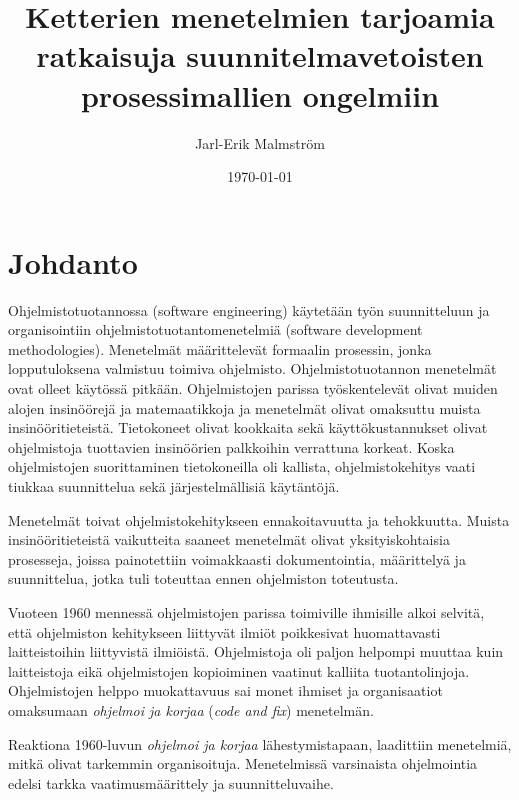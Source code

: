\documentclass[finnish]{tktltiki2}
\title{Ketterien menetelmien tarjoamia ratkaisuja suunnitelmavetoisten prosessimallien ongelmiin}
\author{Jarl-Erik Malmström}
\date{\today}
\theoremstyle{definition}
\theoremstyle{remark}
\begin{document}

\maketitle        %
\makeabstract     %

\tableofcontents  %
\newpage          %



\section{Johdanto}
 
Ohjelmistotuotannossa (software engineering) käytetään työn suunnitteluun ja organisointiin ohjelmistotuotantomenetelmiä (software development methodologies). Menetelmät määrittelevät formaalin prosessin, jonka lopputuloksena valmistuu toimiva ohjelmisto. Ohjelmistotuotannon menetelmät ovat olleet käytössä pitkään. Ohjelmistojen parissa työskentelevät olivat muiden alojen insinöörejä ja matemaatikkoja ja menetelmät olivat omaksuttu muista insinööritieteistä. Tietokoneet olivat kookkaita sekä käyttökustannukset olivat ohjelmistoja tuottavien insinöörien palkkoihin verrattuna korkeat. Koska ohjelmistojen suorittaminen tietokoneilla oli kallista, ohjelmistokehitys vaati tiukkaa suunnittelua sekä järjestelmällisiä käytäntöjä\cite{BOE06}.   

Menetelmät toivat ohjelmistokehitykseen ennakoitavuutta ja tehokkuutta. Muista insinööritieteistä vaikutteita saaneet menetelmät olivat yksityiskohtaisia prosesseja, joissa painotettiin voimakkaasti dokumentointia, määrittelyä ja suunnittelua, jotka tuli toteuttaa ennen ohjelmiston toteutusta\cite{FOW01a}.

Vuoteen 1960 mennessä ohjelmistojen parissa toimiville ihmisille alkoi selvitä, että ohjelmiston kehitykseen liittyvät ilmiöt poikkesivat huomattavasti laitteistoihin liittyvistä ilmiöistä. Ohjelmistoja oli paljon helpompi muuttaa kuin laitteistoja eikä ohjelmistojen kopioiminen vaatinut kalliita tuotantolinjoja. Ohjelmistojen helppo muokattavuus sai monet ihmiset ja organisaatiot omaksumaan \textit{ohjelmoi ja korjaa} (\textit{code and fix}) menetelmän\cite{BOE06}.

Reaktiona 1960-luvun \textit{ohjelmoi ja korjaa} lähestymistapaan, laadittiin menetelmiä, mitkä olivat tarkemmin organisoituja. Menetelmissä varsinaista ohjelmointia edelsi tarkka vaatimusmäärittely ja suunnitteluvaihe\cite{BOE06}.
\end{document}
